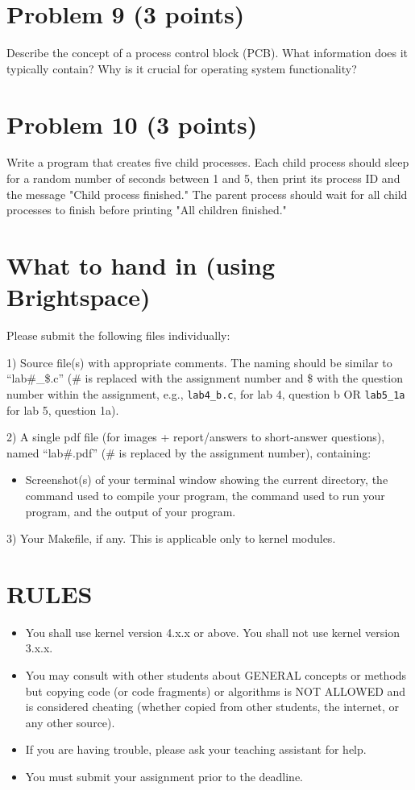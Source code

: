 \documentclass{article}
\begin{document}
\section*{Problem 9 (3 points)}

Describe the concept of a process control block (PCB). What information does it typically contain?  Why is it crucial for operating system functionality?


\section*{Problem 10 (3 points)}

Write a program that creates five child processes. Each child process should sleep for a random number of seconds between 1 and 5, then print its process ID and the message "Child process finished."  The parent process should wait for all child processes to finish before printing "All children finished."


\section*{What to hand in (using Brightspace)}

Please submit the following files individually:

1) Source file(s) with appropriate comments. The naming should be similar to “lab\#\_\$.c” (\# is replaced with the assignment number and \$ with the question number within the assignment, e.g., \texttt{lab4\_b.c}, for lab 4, question b OR \texttt{lab5\_1a} for lab 5, question 1a).

2) A single pdf file (for images + report/answers to short-answer questions), named “lab\#.pdf” (\# is replaced by the assignment number), containing:
    \begin{itemize}
        \item Screenshot(s) of your terminal window showing the current directory, the command used to compile your program, the command used to run your program, and the output of your program.
    \end{itemize}

3) Your Makefile, if any. This is applicable only to kernel modules.


\section*{RULES}

\begin{itemize}
    \item You shall use kernel version 4.x.x or above. You shall not use kernel version 3.x.x.
    \item You may consult with other students about GENERAL concepts or methods but copying code (or code fragments) or algorithms is NOT ALLOWED and is considered cheating (whether copied from other students, the internet, or any other source).
    \item If you are having trouble, please ask your teaching assistant for help.
    \item You must submit your assignment prior to the deadline.
\end{itemize}
\end{document}
